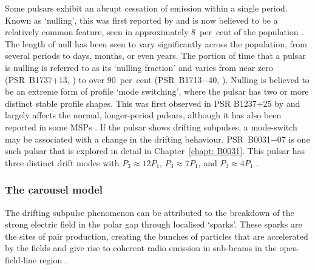 Some pulsars exhibit an abrupt cessation of emission within a single period. Known as `nulling', this was first reported by \citet{Bxxx1970b} and is now believed to be a relatively common feature, seen in approximately 8~per~cent of the population \citep[e.g.][]{Rxxx1976, Bxxx1992, LWxx1995, WMJx2007, GJKx2012, SMxx2021}. The length of null has been seen to vary significantly across the population, from several periods to days, months, or even years. The portion of time that a pulsar is nulling is referred to as its `nulling fraction' and varies from near zero (PSR~B1737+13, \citealt{Bxxx1992}) to over 90~per~cent (PSR~B1713$-$40, \citealt{WMJx2007}). Nulling is believed to be an extreme form of profile `mode switching', where the pulsar has two or more distinct stable profile shapes. This was first observed in PSR B1237+25 by \citet{Bxxx1970b} and largely affects the normal, longer-period pulsars, although it has also been reported in some MSPs \citep[e.g][]{KLL+1999,MKMP2018, BMRx2019}. If the pulsar shows drifting subpulses, a mode-switch may be associated with a change in the drifting behaviour. PSR~B0031$-$07 is one such pulsar that is explored in detail in Chapter~\ref{chapt: B0031}. This pulsar has three distinct drift modes with $P_3 \approx 12 P_1$, $P_3 \approx 7 P_1$, and $P_3 \approx 4 P_1$ \citep{HTTx1970, VKxx1997,SMKx2005, SMS+2007, MBT+2017,MBW+2019}.





\subsubsection{The carousel model}
\label{sec: intro - emission models - single pulse phenomena - carousel model}

The drifting subpulse phenomenon can be attributed to the breakdown of the strong electric field in the polar gap through localised `sparks'. These sparks are the sites of pair production, creating the bunches of particles that are accelerated by the fields and give rise to coherent radio emission in sub-beams in the open-field-line region \citep{RSxx1975, CRxx1977, Bxxx1982, FRxx1982,GSxx2000}.

